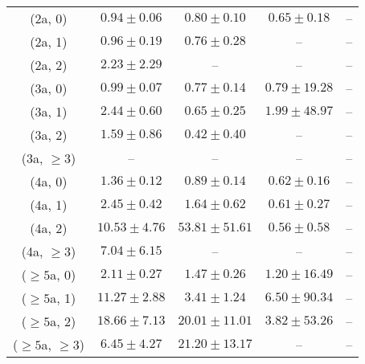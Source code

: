 \begin{table}[h!]
{\begin{tabular}{ccccc}
	(2a, 0) & $0.94\pm 0.06$ & $0.80\pm 0.10$ & $0.65\pm 0.18$ & -- \\[0.5ex] 
	(2a, 1) & $0.96\pm 0.19$ & $0.76\pm 0.28$ & -- & -- \\[0.5ex] 
	(2a, 2) & $2.23\pm 2.29$ & -- & -- & -- \\[0.5ex] 
	(3a, 0) & $0.99\pm 0.07$ & $0.77\pm 0.14$ & $0.79\pm 19.28$ & -- \\[0.5ex] 
	(3a, 1) & $2.44\pm 0.60$ & $0.65\pm 0.25$ & $1.99\pm 48.97$ & -- \\[0.5ex] 
	(3a, 2) & $1.59\pm 0.86$ & $0.42\pm 0.40$ & -- & -- \\[0.5ex] 
	(3a, $\ge3$) & -- & -- & -- & -- \\[0.5ex] 
	(4a, 0) & $1.36\pm 0.12$ & $0.89\pm 0.14$ & $0.62\pm 0.16$ & -- \\[0.5ex] 
	(4a, 1) & $2.45\pm 0.42$ & $1.64\pm 0.62$ & $0.61\pm 0.27$ & -- \\[0.5ex] 
	(4a, 2) & $10.53\pm 4.76$ & $53.81\pm 51.61$ & $0.56\pm 0.58$ & -- \\[0.5ex] 
	(4a, $\ge3$) & $7.04\pm 6.15$ & -- & -- & -- \\[0.5ex] 
	($\ge5$a, 0) & $2.11\pm 0.27$ & $1.47\pm 0.26$ & $1.20\pm 16.49$ & -- \\[0.5ex] 
	($\ge5$a, 1) & $11.27\pm 2.88$ & $3.41\pm 1.24$ & $6.50\pm 90.34$ & -- \\[0.5ex] 
	($\ge5$a, 2) & $18.66\pm 7.13$ & $20.01\pm 11.01$ & $3.82\pm 53.26$ & -- \\[0.5ex] 
	($\ge5$a, $\ge3$) & $6.45\pm 4.27$ & $21.20\pm 13.17$ & -- & -- \\[0.5ex] 
	\hline
	\hline
\end{tabular}}
\end{table}
